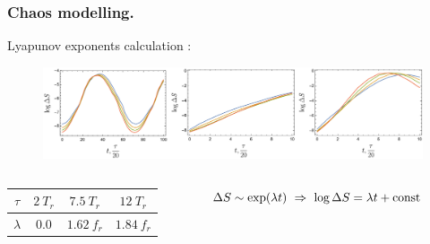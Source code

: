 \begin{frame}
	\frametitle{Chaos modelling.}
	Lyapunov exponents calculation :
	
\begin{figure}[h]
    \includegraphics[width=1.0\textwidth]{figures/lyapunovs.pdf}
\end{figure}



\begin{columns}
	\begin{column}{0.4\linewidth}
		\begin{tabular}{c|c|c|c}
		$\tau$ & $2 \ T_r$ & $7.5 \ T_r$ & $12 \ T_r$	\\ \hline
		$\lambda$ & $0.0$ & $1.62 \ f_r$ & $1.84 \ f_r$
		\end{tabular}	
	\end{column}
	\begin{column}{0.6\linewidth}
		$\Delta S \sim \exp(\lambda t) \ \Rightarrow \ \log \Delta S = \lambda t + \const$\\[5pt]
	\end{column}
\end{columns}	

\phantom{42}


\end{frame}	
